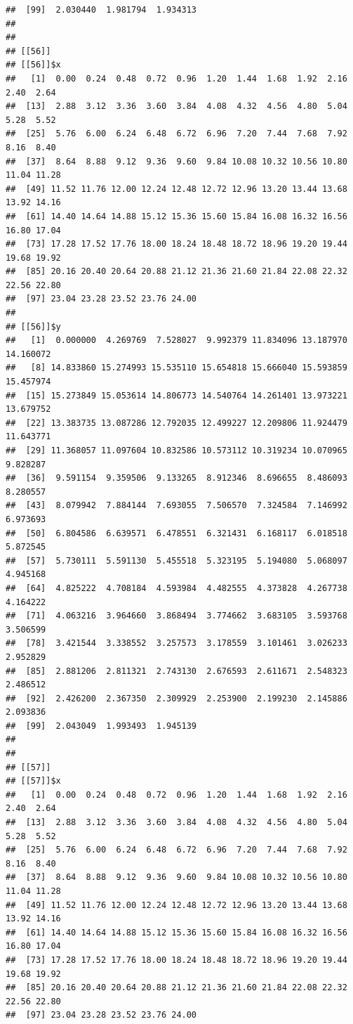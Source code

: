 \documentclass[
  ignorenonframetext,
]{beamer}
\begin{document}
\begin{frame}[fragile]{}
\begin{verbatim}
##  [99]  2.030440  1.981794  1.934313
## 
## 
## [[56]]
## [[56]]$x
##   [1]  0.00  0.24  0.48  0.72  0.96  1.20  1.44  1.68  1.92  2.16  2.40  2.64
##  [13]  2.88  3.12  3.36  3.60  3.84  4.08  4.32  4.56  4.80  5.04  5.28  5.52
##  [25]  5.76  6.00  6.24  6.48  6.72  6.96  7.20  7.44  7.68  7.92  8.16  8.40
##  [37]  8.64  8.88  9.12  9.36  9.60  9.84 10.08 10.32 10.56 10.80 11.04 11.28
##  [49] 11.52 11.76 12.00 12.24 12.48 12.72 12.96 13.20 13.44 13.68 13.92 14.16
##  [61] 14.40 14.64 14.88 15.12 15.36 15.60 15.84 16.08 16.32 16.56 16.80 17.04
##  [73] 17.28 17.52 17.76 18.00 18.24 18.48 18.72 18.96 19.20 19.44 19.68 19.92
##  [85] 20.16 20.40 20.64 20.88 21.12 21.36 21.60 21.84 22.08 22.32 22.56 22.80
##  [97] 23.04 23.28 23.52 23.76 24.00
## 
## [[56]]$y
##   [1]  0.000000  4.269769  7.528027  9.992379 11.834096 13.187970 14.160072
##   [8] 14.833860 15.274993 15.535110 15.654818 15.666040 15.593859 15.457974
##  [15] 15.273849 15.053614 14.806773 14.540764 14.261401 13.973221 13.679752
##  [22] 13.383735 13.087286 12.792035 12.499227 12.209806 11.924479 11.643771
##  [29] 11.368057 11.097604 10.832586 10.573112 10.319234 10.070965  9.828287
##  [36]  9.591154  9.359506  9.133265  8.912346  8.696655  8.486093  8.280557
##  [43]  8.079942  7.884144  7.693055  7.506570  7.324584  7.146992  6.973693
##  [50]  6.804586  6.639571  6.478551  6.321431  6.168117  6.018518  5.872545
##  [57]  5.730111  5.591130  5.455518  5.323195  5.194080  5.068097  4.945168
##  [64]  4.825222  4.708184  4.593984  4.482555  4.373828  4.267738  4.164222
##  [71]  4.063216  3.964660  3.868494  3.774662  3.683105  3.593768  3.506599
##  [78]  3.421544  3.338552  3.257573  3.178559  3.101461  3.026233  2.952829
##  [85]  2.881206  2.811321  2.743130  2.676593  2.611671  2.548323  2.486512
##  [92]  2.426200  2.367350  2.309929  2.253900  2.199230  2.145886  2.093836
##  [99]  2.043049  1.993493  1.945139
## 
## 
## [[57]]
## [[57]]$x
##   [1]  0.00  0.24  0.48  0.72  0.96  1.20  1.44  1.68  1.92  2.16  2.40  2.64
##  [13]  2.88  3.12  3.36  3.60  3.84  4.08  4.32  4.56  4.80  5.04  5.28  5.52
##  [25]  5.76  6.00  6.24  6.48  6.72  6.96  7.20  7.44  7.68  7.92  8.16  8.40
##  [37]  8.64  8.88  9.12  9.36  9.60  9.84 10.08 10.32 10.56 10.80 11.04 11.28
##  [49] 11.52 11.76 12.00 12.24 12.48 12.72 12.96 13.20 13.44 13.68 13.92 14.16
##  [61] 14.40 14.64 14.88 15.12 15.36 15.60 15.84 16.08 16.32 16.56 16.80 17.04
##  [73] 17.28 17.52 17.76 18.00 18.24 18.48 18.72 18.96 19.20 19.44 19.68 19.92
##  [85] 20.16 20.40 20.64 20.88 21.12 21.36 21.60 21.84 22.08 22.32 22.56 22.80
##  [97] 23.04 23.28 23.52 23.76 24.00

\end{verbatim}
\end{frame}
\end{document}
